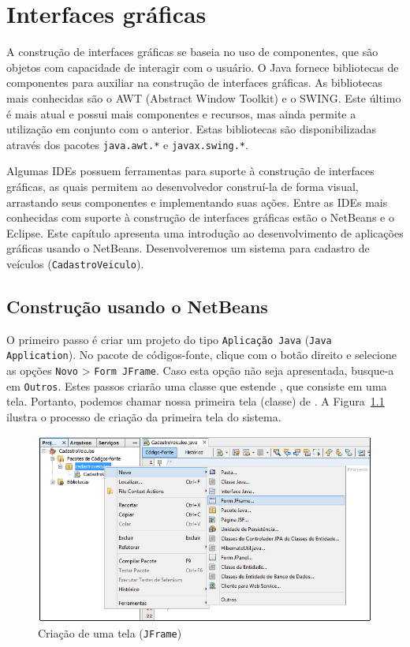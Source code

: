 \chapter{Interfaces gráficas}

A construção de interfaces gráficas se baseia no uso de componentes, que são objetos com capacidade de interagir com o usuário. O Java fornece bibliotecas de componentes para auxiliar na construção de interfaces gráficas. As bibliotecas mais conhecidas são o AWT (Abstract Window Toolkit) e o SWING. Este último é mais atual e possui mais componentes e recursos, mas ainda permite a utilização em conjunto com o anterior. Estas bibliotecas são disponibilizadas através dos pacotes \texttt{java.awt.*} e \texttt{javax.swing.*}.

Algumas IDEs possuem ferramentas para suporte à construção de interfaces gráficas, as quais permitem ao desenvolvedor construí-la de forma visual, arrastando seus componentes e implementando suas ações. Entre as IDEs mais conhecidas com suporte à construção de interfaces gráficas estão o NetBeans e o Eclipse. Este capítulo apresenta uma introdução ao desenvolvimento de aplicações gráficas usando o NetBeans. Desenvolveremos um sistema para cadastro de veículos (\texttt{CadastroVeiculo}).

\section{Construção usando o NetBeans}
O primeiro passo é criar um projeto do tipo \texttt{Aplicação Java} (\texttt{Java Application}). No pacote de códigos-fonte, clique com o botão direito e selecione as opções \texttt{Novo} > \texttt{Form JFrame}. Caso esta opção não seja apresentada, busque-a em \texttt{Outros}. Estes passos criarão uma classe que estende , que consiste em uma tela. Portanto, podemos chamar nossa primeira tela (classe) de . A Figura~\ref{fig:gui-criacao-tela} ilustra o processo de criação da primeira tela do sistema.

\begin{figure}[h]
	\centering
	\includegraphics[width=0.6\textheight]{img/gui-criacao-tela}
	\caption{Criação de uma tela (\texttt{JFrame})}
	\label{fig:gui-criacao-tela}
\end{figure}

